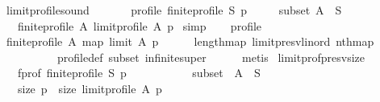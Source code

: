 \begin{isabellebody}
{\isafoldproof}%
%
\isadelimproof
\isanewline
%
\endisadelimproof
\isanewline
{}\isamarkupfalse%
\ limit{\isacharunderscore}{\kern0pt}profile{\isacharunderscore}{\kern0pt}sound{\isacharcolon}{\kern0pt}\isanewline
\ \ \isanewline
\ \ \ \ profile{\isacharcolon}{\kern0pt}\ {\isachardoublequoteopen}finite{\isacharunderscore}{\kern0pt}profile\ S\ p{\isachardoublequoteclose}\ \isanewline
\ \ \ \ subset{\isacharcolon}{\kern0pt}\ {\isachardoublequoteopen}A\ {\isasymsubseteq}\ S{\isachardoublequoteclose}\isanewline
\ \ \ {\isachardoublequoteopen}finite{\isacharunderscore}{\kern0pt}profile\ A\ {\isacharparenleft}{\kern0pt}limit{\isacharunderscore}{\kern0pt}profile\ A\ p{\isacharparenright}{\kern0pt}{\isachardoublequoteclose}\isanewline
%
\isadelimproof
%
\endisadelimproof
%
\isatagproof
{}\isamarkupfalse%
\ {\isacharparenleft}{\kern0pt}simp{\isacharparenright}{\kern0pt}\isanewline
\ \ \isamarkupfalse%
\ profile\isanewline
\ \ \isamarkupfalse%
\ {\isachardoublequoteopen}finite{\isacharunderscore}{\kern0pt}profile\ A\ {\isacharparenleft}{\kern0pt}map\ {\isacharparenleft}{\kern0pt}limit\ A{\isacharparenright}{\kern0pt}\ p{\isacharparenright}{\kern0pt}{\isachardoublequoteclose}\isanewline
\ \ \ \ \isamarkupfalse%
\ length{\isacharunderscore}{\kern0pt}map\ limit{\isacharunderscore}{\kern0pt}presv{\isacharunderscore}{\kern0pt}lin{\isacharunderscore}{\kern0pt}ord\ nth{\isacharunderscore}{\kern0pt}map\isanewline
\ \ \ \ \ \ \ \ \ \ profile{\isacharunderscore}{\kern0pt}def\ subset\ infinite{\isacharunderscore}{\kern0pt}super\isanewline
\ \ \ \ \isamarkupfalse%
\ metis\isanewline
{}\isamarkupfalse%
%
\endisatagproof
{\isafoldproof}%
%
\isadelimproof
\isanewline
%
\endisadelimproof
\isanewline
{}\isamarkupfalse%
\ limit{\isacharunderscore}{\kern0pt}prof{\isacharunderscore}{\kern0pt}presv{\isacharunderscore}{\kern0pt}size{\isacharcolon}{\kern0pt}\isanewline
\ \ \ f{\isacharunderscore}{\kern0pt}prof{\isacharcolon}{\kern0pt}\ {\isachardoublequoteopen}finite{\isacharunderscore}{\kern0pt}profile\ S\ p{\isachardoublequoteclose}\ \isanewline
\ \ \ \ \ \ \ \ \ \ subset{\isacharcolon}{\kern0pt}\ \ {\isachardoublequoteopen}A\ {\isasymsubseteq}\ S{\isachardoublequoteclose}\isanewline
\ \ \ {\isachardoublequoteopen}size\ p\ {\isacharequal}{\kern0pt}\ size\ {\isacharparenleft}{\kern0pt}limit{\isacharunderscore}{\kern0pt}profile\ A\ p{\isacharparenright}{\kern0pt}{\isachardoublequoteclose}\isanewline

\end{isabellebody}
